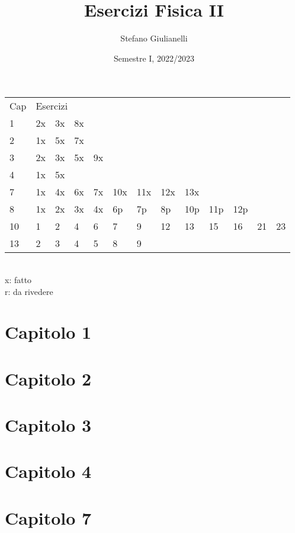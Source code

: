 \documentclass[12pt]{article}
\begin{document}
\author{Stefano Giulianelli}
\title{Esercizi Fisica II}
\date{Semestre I, 2022/2023}
\maketitle{}
\tableofcontents{}
\begin{tabular}{ l l l l l l l l l l l l l }
  Cap & \multicolumn{12}{l}{Esercizi}\\
  1 & 2x & 3x & 8x &&&&&&&&&\\
  2 & 1x & 5x & 7x &&&&&&&&&\\
  3 & 2x & 3x & 5x & 9x &&&&&&&&\\
  4 & 1x & 5x &&&&&&&&&&\\
  7 & 1x & 4x & 6x & 7x & 10x & 11x & 12x & 13x &&&&\\
  8 & 1x & 2x & 3x & 4x & 6p & 7p & 8p & 10p & 11p & 12p &&\\
  10 & 1 & 2 & 4 & 6 & 7 & 9 & 12 & 13 & 15 & 16 & 21 & 23 \\
  13 & 2 & 3 & 4 & 5 & 8 & 9 &&&&&& \\
\end{tabular}
\\x: fatto
\\r: da rivedere
\newpage

\section*{Capitolo 1}



\section*{Capitolo 2}



\section*{Capitolo 3}




\section*{Capitolo 4}


\section*{Capitolo 7}








\end{document}
